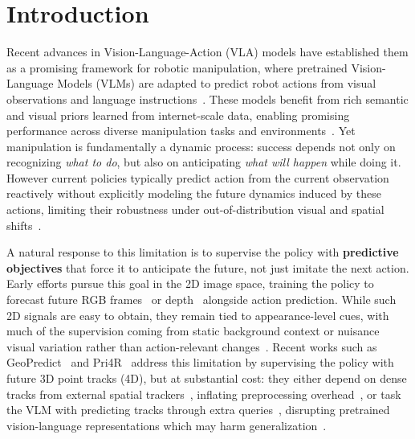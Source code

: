 \section{Introduction}

Recent advances in Vision-Language-Action (VLA) models have established them as a promising framework for robotic manipulation, where pretrained Vision-Language Models (VLMs) are adapted to predict robot actions from visual observations and language instructions~\citep{brohan2022rt, zitkovich2023rt, black2410pi0, kim2025openvla, kim2025fine}. These models benefit from rich semantic and visual priors learned from internet-scale data, enabling promising performance across diverse manipulation tasks and environments~\citep{zhong2025survey}. Yet manipulation is fundamentally a dynamic process: success depends not only on recognizing \textit{what to do}, but also on anticipating \textit{what will happen} while doing it. However current policies typically predict action from the current observation reactively without explicitly modeling the future dynamics induced by these actions, limiting their robustness under out-of-distribution visual and spatial shifts~\citep{li2025surveyvisionlanguageactionmodelsembodied}.


A natural response to this limitation is to supervise the policy with \textbf{predictive objectives} that force it to anticipate the future, not just imitate the next action. Early efforts pursue this goal in the 2D image space, training the policy to forecast future RGB frames~\citep{cen2025worldvla, wu2024unleashing} or depth~\citep{zhangdreamvla} alongside action prediction. While such 2D signals are easy to obtain, they remain tied to appearance-level cues, with much of the supervision coming from static background context or nuisance visual variation rather than action-relevant changes~\citep{fei2025liberoplus, chen2025robotwin}. Recent works such as GeoPredict~\citep{qian2025geopredict} and Pri4R~\citep{kim2026pri4rlearningworlddynamics} address this limitation by supervising the policy with future 3D point tracks (4D), but at substantial cost: they either depend on dense tracks from external spatial trackers~\citep{xiao2025spatialtracker}, inflating preprocessing overhead~\citep{kim2026pri4rlearningworlddynamics}, or task the VLM with predicting tracks through extra queries~\citep{qian2025geopredict}, disrupting pretrained vision-language representations which may harm generalization~\citep{zhang2026vlmvla, driess2025knowledgeinsulatingvisionlanguageactionmodels}.


